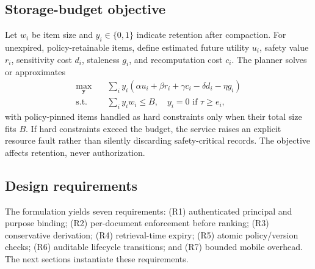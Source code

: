 \subsection{Storage-budget objective}

Let $w_i$ be item size and $y_i\in\{0,1\}$ indicate retention after compaction. For unexpired, policy-retainable items, define estimated future utility $u_i$, safety value $r_i$, sensitivity cost $d_i$, staleness $g_i$, and recomputation cost $c_i$. The planner solves or approximates
\begin{align}
\max_{\bm y}\quad &\sum_i y_i(\alpha u_i+\beta r_i+\gamma c_i-\delta d_i-\eta g_i)\\
\text{s.t.}\quad &\sum_i y_iw_i\le B,\quad y_i=0\text{ if }\tau\ge e_i,
\label{eq:eviction}
\end{align}
with policy-pinned items handled as hard constraints only when their total size fits $B$. If hard constraints exceed the budget, the service raises an explicit resource fault rather than silently discarding safety-critical records. The objective affects retention, never authorization.

\subsection{Design requirements}

The formulation yields seven requirements: (R1) authenticated principal and purpose binding; (R2) per-document enforcement before ranking; (R3) conservative derivation; (R4) retrieval-time expiry; (R5) atomic policy/version checks; (R6) auditable lifecycle transitions; and (R7) bounded mobile overhead. The next sections instantiate these requirements.
